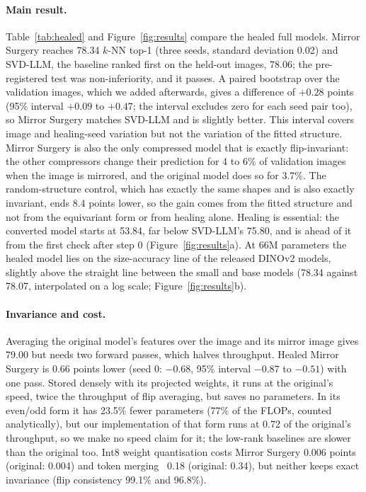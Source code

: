 \paragraph{Main result.}
Table~\ref{tab:healed} and Figure~\ref{fig:results} compare the healed full models. Mirror Surgery reaches 78.34 $k$-NN top-1 (three seeds,
standard deviation 0.02) and SVD-LLM, the baseline ranked first on the held-out images, 78.06; the pre-registered
test was non-inferiority, and it passes. A paired bootstrap over the validation images, which we added afterwards,
gives a difference of $+0.28$ points (95\% interval $+0.09$ to $+0.47$; the interval excludes zero for each seed
pair too), so Mirror Surgery matches SVD-LLM and is slightly better. This interval covers image and healing-seed
variation but not the variation of the fitted structure. Mirror Surgery is also the only compressed model that is
exactly flip-invariant: the other compressors change their prediction for 4 to 6\% of validation images when the image
is mirrored, and the original model does so for 3.7\%. The random-structure control, which has exactly the same shapes
and is also exactly invariant, ends 8.4 points lower, so the gain comes from the fitted structure and not from the
equivariant form or from healing alone. Healing is essential: the converted model starts at 53.84, far below
SVD-LLM's 75.80, and is ahead of it from the first check after step 0 (Figure~\ref{fig:results}a). At 66M parameters
the healed model lies on the size-accuracy line of the released DINOv2 models, slightly above the straight line between
the small and base models (78.34 against 78.07, interpolated on a log scale; Figure~\ref{fig:results}b).

\paragraph{Invariance and cost.}
Averaging the original model's features over the image and its mirror image gives 79.00 but needs two forward passes,
which halves throughput. Healed Mirror Surgery is 0.66 points lower (seed 0: $-0.68$, 95\% interval $-0.87$ to $-0.51$)
with one pass. Stored densely with its projected weights, it runs at the original's speed, twice the throughput of flip
averaging, but saves no parameters. In its even/odd form it has 23.5\% fewer parameters (77\% of the FLOPs, counted
analytically), but our implementation of that form runs at 0.72 of the original's throughput, so we make no speed claim
for it; the low-rank baselines are slower than the original too. Int8 weight quantisation costs Mirror Surgery 0.006
points (original: 0.004) and token merging~\citep{bolya2023tome} 0.18 (original: 0.34), but neither keeps exact
invariance (flip consistency 99.1\% and 96.8\%).

